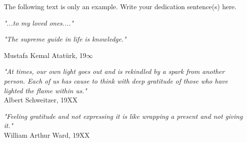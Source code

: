 \thispagestyle{empty}
{\color{red}The following text is only an example. Write your dedication sentence(s) here.}
\medskip

\medskip
\medskip
\medskip
\medskip
\medskip
\medskip
\medskip


\begin{flushright}
            \Large{ \textit{"...to my loved ones...."}}

             \Large{ \textit{"The supreme guide in life is knowledge."} \\ \vspace{0.5cm}

Mustafa Kemal Atatürk, 19$\infty$ }

\Large{
    \textit{"At times, our own light goes out and is rekindled by a spark from another person. Each of us has cause to think with deep gratitude of those who have lighted the flame within us."} \\ \vspace{0.5cm}
            Albert Schweitzer, 19XX
            }
            
            \Large{ \textit{"Feeling gratitude and not expressing it is like wrapping a present and not giving it."} \\ \vspace{0.5cm}
            William Arthur Ward, 19XX
            }
            
        
            
\end{flushright}
\vfill
